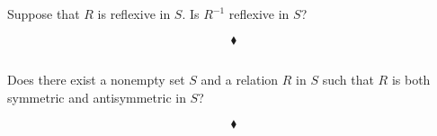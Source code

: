 \subsection{}
\begin{tcolorbox}
 Suppose that $R$ is reflexive in $S$. Is $R^{-1}$ reflexive in $S$?
 \end{tcolorbox}
$$ $$
$$\blacklozenge$$


\subsection{}
\begin{tcolorbox}
Does there exist a nonempty set $S$ and a relation $R$ in $S$ such that $R$ is both symmetric and antisymmetric in $S$? 
\end{tcolorbox}
$$ $$
$$\blacklozenge$$


